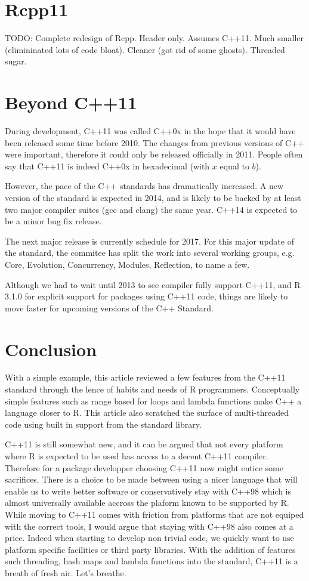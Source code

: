\section{Rcpp11}

TODO: 
Complete redesign of Rcpp. 
Header only. Assumes C++11.
Much smaller (elimininated lots of code bloat). 
Cleaner (got rid of some ghosts). 
Threaded sugar. 

\section{Beyond C++11}

During development, C++11 was called C++0x in the hope that it would have been 
released some time before 2010. The changes from previous versions of C++
were important, therefore it could only be released officially in 2011. People
often say that C++11 is indeed C++0x in hexadecimal (with $x$ equal to $b$). 

However, the pace of the C++ standards has dramatically increased. A new version
of the standard is expected in 2014, and is likely to be backed by at least 
two major compiler suites (gcc and clang) the same year. C++14 is expected to
be a minor bug fix release. 

The next major release is currently schedule for 2017. For this major 
update of the standard, the commitee has split the work into several 
working groups, e.g. Core, Evolution, Concurrency, Modules, Reflection, to name
a few. 

Although we had to wait until 2013 to see compiler fully support C++11, and
R 3.1.0 for explicit support for packages using C++11 code, things are likely 
to move faster for upcoming versions of the C++ Standard. 

\section{Conclusion}

With a simple example, this article reviewed a few features from
the C++11 standard through the lence of habits and needs of R programmers. 
Conceptually simple features such as range based for loops and lambda functions
make C++ a language closer to R. This article also scratched the surface
of multi-threaded code using built in support from the standard library. 

C++11 is still somewhat new, and it can be argued that not every platform
where R is expected to be used has access to a decent C++11 compiler. Therefore
for a package developper choosing C++11 now might entice some sacrifices. There is a 
choice to be made between using a nicer language that will enable us to write
better software or conservatively stay with C++98 which is 
almost universally available accross the plaform known to be supported by R. 
While moving to C++11 comes with friction from platforms that are not equiped
with the correct tools, I would argue that staying 
with C++98 also comes at a price. Indeed when starting to develop non trivial 
code, we quickly want to use platform specific facilities or 
third party libraries. With the addition of features such threading, hash maps and lambda
functions into the standard, C++11 is a breath of fresh air. Let's breathe.  

